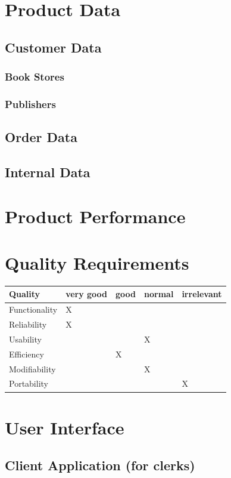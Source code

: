 \documentclass[11pt,a4paper,oneside,svgnames]{report}
\begin{document}
\chapter{Product Data}
\section{Customer Data}
\subsection{Book Stores}
\subsection{Publishers}
\section{Order Data}
\section{Internal Data}

\chapter{Product Performance}
\chapter{Quality Requirements}
\begin{table}[h!]
 \begin{tabular}{lllll}
  \hline
  Quality & very good & good & normal & irrelevant \\
  \hline
  Functionality & X & & & \\
  Reliability & X & & & \\
  Usability & & & X & \\
  Efficiency & & X & & \\
  Modifiability & & & X & \\
  Portability & & & & X \\
  \hline
 \end{tabular}
\end{table}

\chapter{User Interface}
\section{Client Application (for clerks)}
\end{document}
